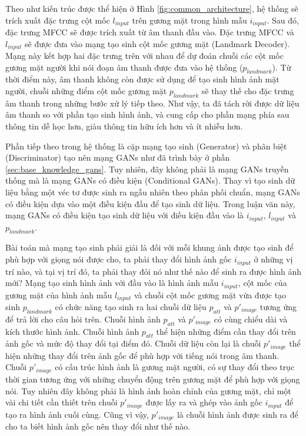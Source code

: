 Theo như kiến trúc được thể hiện ở Hình \ref{fig:common_architecture}, hệ thống sẽ trích xuất đặc trưng cột mốc $l_{input}$ trên gương mặt trong hình mẫu $i_{input}$. Sau đó, đặc trưng MFCC sẽ được trích xuất từ âm thanh đầu vào. Đặc trưng MFCC và $l_{input}$ sẽ được đưa vào mạng tạo sinh cột mốc gương mặt (Landmark Decoder). Mạng này kết hợp hai đặc trưng trên với nhau để dự đoán chuỗi các cột mốc gương mặt người khi nói đoạn âm thanh được đưa vào hệ thống ($p_{landmark}$). Từ thời điểm này, âm thanh không còn được sử dụng để tạo sinh hình ảnh mặt người, chuỗi những điểm cột mốc gương mặt $p_{landmark}$ sẽ thay thế cho đặc trưng âm thanh trong những bước xử lý tiếp theo. Như vậy, ta đã tách rời được dữ liệu âm thanh so với phần tạo sinh hình ảnh, và cung cấp cho phần mạng phía sau thông tin dễ học hơn, giàu thông tin hữu ích hơn và ít nhiễu hơn. 

Phần tiếp theo trong hệ thống là cặp mạng tạo sinh (Generator) và phân biệt (Discriminator) tạo nên mạng GANs như đã trình bày ở phần \ref{sec:base_knowledge_gans}. Tuy nhiên, đây không phải là mạng GANs truyền thống mà là mạng GANs có điều kiện (Conditional GANs). Thay vì tạo sinh dữ liệu bằng một véc tơ được sinh ra ngẫu nhiên theo phân phối chuẩn, mạng GANs có điều kiện dựa vào một điều kiện đầu để tạo sinh dữ liệu. Trong luận văn này, mạng GANs có điều kiện tạo sinh dữ liệu với điều kiện đầu vào là $i_{input}$, $l_{input}$ và $p_{landmark}$.

Bài toán mà mạng tạo sinh phải giải là đối với mỗi khung ảnh được tạo sinh để phù hợp với giọng nói được cho, ta phải thay đổi hình ảnh gốc $i_{input}$ ở những vị trí nào, và tại vị trí đó, ta phải thay đỏi nó như thế nào để sinh ra được hình ảnh mới? Mạng tạo sinh hình ảnh với đầu vào là hình ảnh mẫu $i_{input}$, cột mốc của gương mặt của hình ảnh mẫu $l_{input}$ và chuỗi cột mốc gương mặt vừa được tạo sinh $p_{landmark}$ có chức năng tạo sinh ra hai chuỗi dữ liệu $p_{att}$ và $p'_{image}$ tương ứng để trả lời cho câu hỏi trên. Chuỗi hình ảnh $p_{att}$ và $p'_{image}$ có cùng chiểu dài và kích thước hình ảnh. Chuỗi hình ảnh $p_{att}$ thể hiện những điểm cần thay đổi trên ảnh gốc và mức độ thay đổi tại điểm đó. Chuỗi dữ liệu còn lại là chuỗi $p'_{image}$ thể hiện những thay đổi trên ảnh gốc để phù hợp với tiếng nói trong âm thanh. Chuỗi $p'_{image}$ có cấu trúc hình ảnh là gương mặt người, có sự thay đổi theo trục thời gian tương ứng với những chuyển động trên gương mặt để phù hợp với giọng nói. Tuy nhiên đây không phải là hình ảnh hoàn chỉnh của gương mặt, chỉ một vài chi tiết cần thiết trên chuỗi $p'_{image}$ được lấy ra và ghép vào ảnh gốc $i_{input}$ để tạo ra hình ảnh cuối cùng. Cũng vì vậy, $p'_{image}$ là chuỗi hình ảnh được sinh ra để cho ta biết hình ảnh gốc nên thay đổi như thế nào. 

